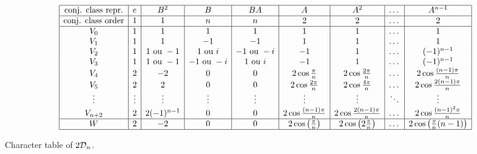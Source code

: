             \begin{table}[H]
                \centering
                {\small
                \begin{equation*}
                        \begin{array}{|c|c|c|c|c|c|c|c|c|}
                            \hline
                            \text{conj. class repr.} & e & B^2 & B & BA & A & A^2 & \dots & A^{n-1} \\ \hline
                            \text{conj. class order} & 1 & 1 & n & n & 2 & 2 & \dots & 2 \\
                            \hline
                            V_0 & 1 & 1 & 1 & 1 & 1 & 1 & \dots & 1 \\ 
                            V_1 & 1 & 1 & -1 & -1 & 1 & 1 & \dots & 1 \\ 
                            V_2 & 1 & 1 \text{ ou } -1 & 1 \text{ ou } i & -1 \text{ ou } -i & -1 & 1 & \dots & (-1)^{n-1} \\ 
                            V_3 & 1 & 1 \text{ ou } -1 & -1 \text{ ou } -i & 1 \text{ ou } i & -1 & 1 & \dots & (-1)^{n-1} \\
                            V_4 & 2 & -2 & 0 & 0 & 2\cos\frac{\pi}{n} & 2\cos\frac{2\pi}{n} & \dots & 2\cos\frac{(n-1)\pi}{n}\\
                            V_5 & 2 & 2 & 0 & 0 & 2\cos\frac{2\pi}{n} & 2\cos\frac{4\pi}{n} & \dots & 2\cos\frac{2(n-1)\pi}{n}\\
                            \vdots & \vdots & \vdots & \vdots & \vdots & \vdots & \vdots & \ddots & \vdots \\
                            V_{n+2} & 2 & 2(-1)^{n-1} & 0 & 0 & 2\cos\frac{(n-1)\pi}{n} & 2\cos\frac{2(n-1)\pi}{n} & \dots & 2\cos\frac{(n-1)^2\pi}{n} \\ \hline
                            W & 2 & -2 & 0 & 0 & 2\cos\left(\frac{\pi}{n}\right) & 2\cos\left(2\frac{\pi}{n}\right) & \dots & 2\cos\left(\frac{\pi}{n}(n-1)\right) \\ \hline
                            \end{array}
                    \end{equation*}}
                \caption{Character table of $2\mathcal{D}_n$.}
            \end{table}

